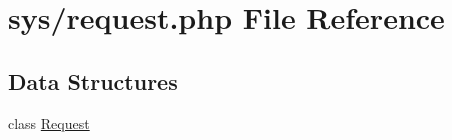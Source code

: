 \hypertarget{request_8php}{}\section{sys/request.php File Reference}
\label{request_8php}
\subsection*{Data Structures}
\begin{DoxyCompactItemize}
\item 
class \hyperlink{classRequest}{Request}
\end{DoxyCompactItemize}

